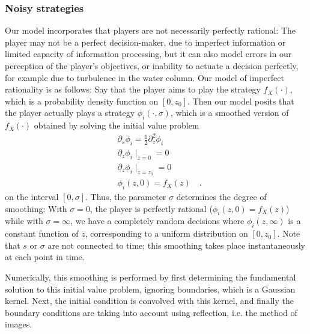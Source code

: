 \subsubsection*{Noisy strategies}
Our model incorporates that players are not necessarily perfectly rational: The player may not be a perfect decision-maker, due to imperfect information or limited capacity of information processing, but it can also model errors in our perception of the player's objectives, or inability to actuate a decision perfectly, for example due to turbulence in the water column. Our model of imperfect rationality is as follows: Say that the player aims to play the strategy $f_X(\cdot)$, which is a probability density function on $[0,z_0]$. Then our model posits that the player actually plays a strategy $\phi_i(\cdot ,\sigma)$, which is a smoothed version of $f_X(\cdot)$ obtained by solving the initial value problem
\begin{align}
  \label{eq:density_PDE}
  &\partial_s \phi_i = \frac{1}{2}\partial_z^2 \phi_i \\
  &\partial_z \phi_i \mid_{z=0} = 0 \\
  &\partial_z \phi_i \mid_{z = z_0} = 0 \\
  & \phi_i(z,0) = f_X(z) \quad . 
\end{align}
on the interval $[0,\sigma]$. Thus, the parameter $\sigma$ determines the degree of smoothing: With $\sigma=0$, the player is perfectly rational ($\phi_i(z,0)=f_X(z)$) while with $\sigma=\infty$, we have a completely random decisions where $\phi_i(z,\infty)$ is a constant function of $z$, corresponding to a uniform distribution on $[0,z_0]$. Note that $s$ or $\sigma$ are not connected to time; this smoothing takes place instantaneously at each point in time. 

Numerically, this smoothing is performed by first determining the fundamental solution to this initial value problem, ignoring boundaries, which is a Gaussian kernel. Next, the initial condition is convolved with this kernel, and finally the boundary conditions are taking into account using reflection, i.e. the method of images. 



